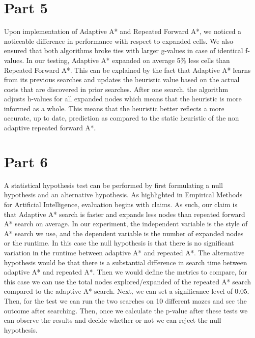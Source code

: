 \documentclass{article}
\begin{document}
\section*{Part 5}
Upon implementation of Adaptive A* and Repeated Forward A*, we noticed a noticeable difference in performance with respect to expanded cells. We also ensured that both algorithms broke ties with larger g-values in case of identical f-values. In our testing, Adaptive A* expanded on average 5\% less cells than Repeated Forward A*. This can be explained by the fact that Adaptive A* learns from its previous searches and updates the heuristic value based on the actual costs that are discovered in prior searches. After one search, the algorithm adjusts h-values for all expanded nodes which means that the heuristic is more informed as a whole. This means that the heuristic better reflects a more accurate, up to date, prediction as compared to the static heuristic of the non adaptive repeated forward A*.

\section*{Part 6}
A statistical hypothesis test can be performed by first formulating a null hypothesis and an alternative hypothesis. As highlighted in Empirical Methods for Artificial Intelligence, evaluation begins with claims. As such, our claim is that Adaptive A* search is faster and expands less nodes than repeated forward A* search on average. In our experiment, the independent variable is the style of A* search we use, and the dependent variable is the number of expanded nodes or the runtime. In this case the null hypothesis is that there is no significant variation in the runtime between adaptive A* and repeated A*. The alternative hypothesis would be that there is a substantial difference in search time between adaptive A* and repeated A*. Then we would define the metrics to compare, for this case we can use the total nodes explored/expanded of the repeated A* search compared to the adaptive A* search. Next, we can set a significance level of 0.05. Then, for the test we can run the two searches on 10 different mazes and see the outcome after searching. Then, once we calculate the p-value after these tests we can observe the results and decide whether or not we can reject the null hypothesis. 
\end{document}
